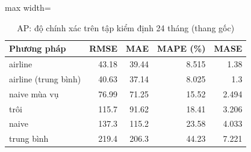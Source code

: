 \begin{table}[H]
\centering\footnotesize
\caption{AP: độ chính xác trên tập kiểm định 24 tháng (thang gốc)}\label{tab:tab_b12_11_ap_benchmarks}
\begin{adjustbox}{max width=\linewidth}
\begin{tabular}{|l|r|r|r|r|}
\toprule
Phương pháp & RMSE & MAE & MAPE (\%) & MASE \\
\midrule
airline & 43.18 & 39.44 & 8.515 & 1.38 \\
airline (trung bình) & 40.63 & 37.14 & 8.025 & 1.3 \\
naive mùa vụ & 76.99 & 71.25 & 15.52 & 2.494 \\
trôi & 115.7 & 91.62 & 18.41 & 3.206 \\
naive & 137.3 & 115.2 & 23.58 & 4.033 \\
trung bình & 219.4 & 206.3 & 44.23 & 7.221 \\
\bottomrule
\end{tabular}
\end{adjustbox}\par{}
\end{table}
